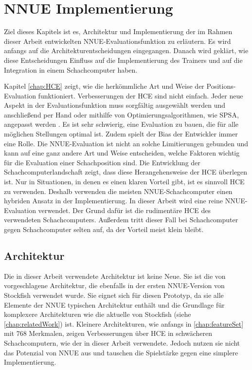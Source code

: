\chapter{NNUE Implementierung}

Ziel dieses Kapitels ist es, Architektur und Implementierung der im Rahmen dieser Arbeit entwickelten \ac{NNUE}-Evaluationsfunktion zu erläutern. Es wird anfangs auf die Architekturentscheidungen eingegangen. Danach wird geklärt, wie diese Entscheidungen Einfluss auf die Implementierung des Trainers und auf die Integration in einem Schachcomputer haben.

Kapitel \autoref{chap:HCE} zeigt, wie die herkömmliche Art und Weise der Positions-Evaluation funktioniert. Verbesserungen der \ac{HCE} sind nicht einfach. Jeder neue Aspekt in der Evaluationsfunktion muss sorgfältig ausgewählt werden und anschließend per Hand oder mithilfe von Optimierungsalgorithmen, wie \zb{} \ac{SPSA}, angepasst werden \cite{spall1992multivariate}. Es ist sehr schwierig, eine Evaluation zu bauen, die für alle möglichen Stellungen optimal ist. Zudem spielt der Bias der Entwickler immer eine Rolle. Die \ac{NNUE}-Evaluation ist nicht an solche Limitierungen gebunden und kann auf eine ganz andere Art und Weise entscheiden, welche Faktoren wichtig für die Evaluation einer Schachposition sind. Die Entwicklung der Schachcomputerlandschaft zeigt, dass diese Herangehensweise der \ac{HCE} überlegen ist. Nur in Situationen, in denen es einen klaren Vorteil gibt, ist es sinnvoll \ac{HCE} zu verwenden. Deshalb verwenden die meisten \ac{NNUE}-Schachcomputer einen hybriden Ansatz in der Implementierung. In dieser Arbeit wird eine reine \ac{NNUE}-Evaluation verwendet. Der Grund dafür ist die rudimentäre \ac{HCE} des verwendeten Schachcomputers. Außerdem tritt dieser Fall bei Schachcomputer gegen Schachcomputer selten auf, da der Vorteil meist klein bleibt.

\section{Architektur}

Die in dieser Arbeit verwendete Architektur ist keine Neue. Sie ist die von \citeauthor{YNasu2018} \cite{YNasu2018} vorgeschlagene Architektur, die ebenfalls in der ersten \ac{NNUE}-Version von Stockfish verwendet wurde. Sie eignet sich für diesen Prototyp, da sie alle Elemente der \ac{NNUE} typischen Architektur enthält und die Grundlage für komplexere Architekturen wie die aktuelle von Stockfish (siehe \autoref{chap:relatedWork}) ist. Kleinere Architekturen, wie anfangs in \autoref{chap:featureSet} mit $768$ Merkmalen, zeigen Verbesserungen über \ac{HCE} in schwächeren Schachcomputern, wie der in dieser Arbeit verwendete. Jedoch nutzen sie nicht das Potenzial von \ac{NNUE} aus und tauschen die Spielstärke gegen eine simplere Implementierung.

